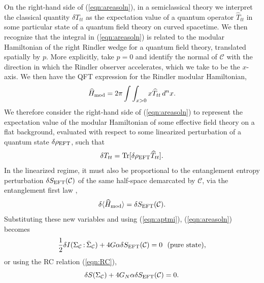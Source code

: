 \documentclass[%
12pt,preprint,
nofootinbib,
amsmath,amssymb,
aps,
prd,
showpacs,
superscriptaddress
]{revtex4-2}
\DeclareMathOperator{\Tr}{Tr}
\newcommand{\region}{\Sigma}
\DeclareMathOperator{\co}{:}
\begin{document}
On the right-hand side of (\ref{eqn:areasoln}), in a semiclassical theory we interpret the classical quantity $\delta T_{tt}$ as the expectation value of a quantum operator $\widehat{T}_{tt}$ in some particular state of a quantum field theory on curved spacetime.
We then recognize that the integral in (\ref{eqn:areasoln}) is related to the modular Hamiltonian of the right Rindler wedge for a quantum field theory, translated spatially by $p$. More explicitly, take $p=0$ and identify the normal of $\mathcal{C}$ with the direction in which the Rindler observer accelerates, which we take to be the $x$-axis.
We then have the QFT expression for the Rindler modular Hamiltonian,
\begin{equation}
\widehat{H}_{\rm mod}=2\pi\int\int_{x>0} x \widehat{T}_{tt} \, d^n x.
\end{equation}
We therefore consider the right-hand side of (\ref{eqn:areasoln}) to represent the expectation value of the modular Hamiltonian of some effective field theory on a flat background, evaluated with respect to some linearized perturbation of a quantum state $\delta \rho_{\rm EFT}$, such that 
\begin{equation}
\delta T_{tt}= \Tr[\delta\rho_{\rm EFT}\widehat{T}_{tt}]. 
\end{equation}
In the linearized regime, it must also be proportional to the entanglement entropy perturbation $\delta S_{\rm EFT}(\mathcal{C})$ of the same half-space demarcated by $\mathcal{C}$, via the entanglement first law \cite{Blanco:2013joa},
\begin{equation}
\delta\langle \widehat H_{\rm mod}\rangle=\delta S_{\rm EFT}(\mathcal{C}).
\end{equation}
Substituting these new variables and using (\ref{eqn:aptmi}), (\ref{eqn:areasoln}) becomes
\begin{equation}
\frac 1 2\delta I({\region}_{\mathcal{C}}\co\bar{{\region}}_{\mathcal{C}}) +4G\alpha\delta S_{\rm EFT}(\mathcal{C})=0 ~~\rm (pure~state),
\end{equation}
or using the RC relation (\ref{eqn:RC}), 
\begin{equation}
 \delta S({\region}_{\mathcal{C}})+4G_N\alpha\delta S_{\rm EFT}(\mathcal{C})=0.
\label{eqn:EEEC}
\end{equation}
\end{document}
